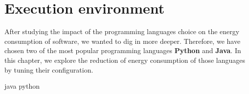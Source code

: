 \newpage

\chapter{Execution environment}
\label{chapter:enviroment}
After studying the impact of the programming languages choice on the energy consumption of software, we wanted to dig in more deeper.
Therefore, we have chosen two of the most popular programming languages \textbf{Python} and \textbf{Java}.
In this chapter, we explore the reduction of energy consumption of those languages by tuning their configuration.

{java}
{python}
